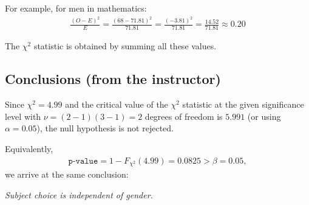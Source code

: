 For example, for men in mathematics:
\begin{align}
	\frac{(O-E)^2}{E} = \frac{(68-71.81)^2}{71.81} = \frac{(-3.81)^2}{71.81} = \frac{14.52}{71.81} \approx 0.20
\end{align}

The $\chi^2$ statistic is obtained by summing all these values.

\subsection{Conclusions (from the instructor)}
Since $\chi^2= 4.99$ and the critical value of the $\chi^2$ statistic at the given significance level with $\nu=(2-1)(3-1)=2$ degrees of freedom is $5.991$ (or using $\alpha=0.05$), the null hypothesis is not rejected.

Equivalently,
\begin{align}
	\texttt{p-value}=1- F_{\chi^{2}}(4.99)=0.0825>\beta=0.05,
\end{align}
we arrive at the same conclusion:
\begin{center}
	\emph{Subject choice is independent of gender.}
\end{center}
